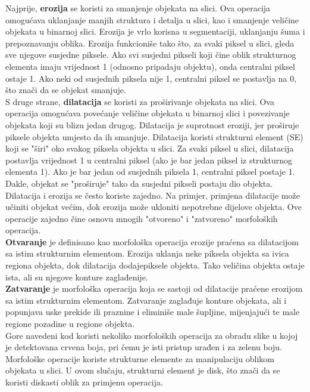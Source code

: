 \documentclass[a4paper,12pt]{article}
\begin{document}
Najprije, \textbf{erozija} se koristi za smanjenje objekata na slici. Ova operacija omogućava uklanjanje manjih struktura i detalja u slici, kao i smanjenje veličine objekata u binarnoj slici.
Erozija je vrlo korisna u segmentaciji, uklanjanju šuma i prepoznavanju oblika. 
Erozija funkcioniše tako što, za svaki piksel u slici, gleda sve njegove susjedne piksele. 
Ako svi susjedni pikseli koji čine oblik strukturnog elementa imaju vrijednost 1 (odnosno pripadaju objektu), onda centralni piksel ostaje 1. Ako neki od susjednih piksela nije 1, centralni piksel se postavlja na 0, što znači da se objekat smanjuje.\\

S druge strane, \textbf{dilatacija} se koristi za proširivanje objekata na slici. 
Ova operacija omogućava povećanje veličine objekata u binarnoj slici i povezivanje objekata koji su blizu jedan drugog. 
Dilatacija je suprotnost eroziji, jer proširuje piksele objekta umjesto da ih smanjuje. 
Dilatacija koristi strukturni element (SE) koji se "širi" oko svakog piksela objekta u slici. 
Za svaki piksel u slici, dilatacija postavlja vrijednost 1 u centralni piksel (ako je bar jedan piksel iz strukturnog elementa 1). 
Ako je bar jedan od susjednih piksela 1, centralni piksel postaje 1. 
Dakle, objekat se "proširuje" tako da susjedni pikseli postaju dio objekta. 
\\
Dilatacija i erozija se često koriste zajedno. Na primjer, primjena dilatacije može učiniti objekat većim, dok erozija može ukloniti nepotrebne dijelove objekta.
 Ove operacije zajedno čine osnovu mnogih "otvoreno" i "zatvoreno" morfoloških operacija. \\

\textbf{Otvaranje} je definisano kao morfološka operacija erozije praćena sa dilatacijom sa istim strukturnim elementom. 
Erozija uklanja neke piksela objekta sa ivica regiona objekta, dok dilatacija dodajepiksele objekta. Tako veličina objekta ostaje ista, ali su njegove konture zaglađenije. \\

\textbf{Zatvaranje} je morfološka operacija koja se sastoji od dilatacije praćene erozijom sa istim strukturnim elementom. 
Zatvaranje zaglađuje konture objekata, ali i popunjava uske prekide ili praznine i eliminiše male šupljine, mijenjajući te male regione pozadine u regione objekta.\\

Gore navedeni kod koristi nekoliko morfoloških operacija za obradu slike u kojoj je detektovana crvena boja, pri čemu je isti pristup urađen i za zelenu boju. 
Morfološke operacije koriste strukturne elemente za manipulaciju oblikom objekata u slici. 
U ovom slučaju, strukturni element je disk, što znači da se koristi diskasti oblik za primjenu operacija.
\\
\end{document}
